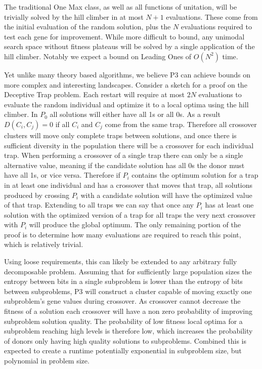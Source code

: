 \documentclass{sig-alternate}
\begin{document}
The traditional One Max class, as well as all functions of unitation, will be
trivially solved by the hill climber in at most $N+1$ evaluations.  These come
from the initial evaluation of the random solution, plus the $N$ evaluations required
to test each gene for improvement.  While more difficult to bound, any unimodal
search space without fitness plateaus will be solved by a single application
of the hill climber.  Notably we expect a bound on Leading Ones of $O(N^2)$ time.

Yet unlike many theory based algorithms, we believe P3 can achieve bounds on more
complex and interesting landscapes.  Consider a sketch for a proof on the Deceptive
Trap problem.  Each restart will require at most $2N$ evaluations to evaluate the
random individual and optimize it to a local optima using the hill climber.  In
$P_0$ all solutions will either have all 1s or all 0s.  As a result $D(C_i, C_j) = 0$
if all $C_i$ and $C_j$ come from the same trap.  Therefore all crossover clusters
will move only complete traps between solutions, and once there is sufficient
diversity in the population there will be a crossover for each individual trap.
When performing a crossover of a single trap there can only be a single alternative
value, meaning if the candidate solution has all 0s the donor must have all 1s, or vice
versa.  Therefore if $P_i$ contains the optimum solution for a trap in at least one
individual and has a crossover that moves that trap, all solutions produced by crossing
$P_i$ with a candidate solution will have the optimized value of that trap.  Extending to
all traps we can say that once any $P_i$ has at least one solution with the optimized
version of a trap for all traps the very next crossover with $P_i$ will produce the global optimum.
The only remaining portion of the proof is to determine how many evaluations are required to reach this point,
which is relatively trivial.

Using loose requirements, this can likely be extended to any arbitrary fully decomposable
problem. Assuming that for sufficiently large population sizes the entropy between
bits in a single subproblem is lower than the entropy of bits between subproblems,
P3 will construct a cluster capable of moving exactly one subproblem's gene values
during crossover.  As crossover cannot decrease the fitness of a solution each
crossover will have a non zero probability of improving subproblem solution quality.
The probability of low fitness local optima for a subproblem reaching high levels
is therefore low, which increases the probability of donors only having high quality
solutions to subproblems.  Combined this is expected to create a runtime potentially
exponential in subproblem size, but polynomial in problem size.
\end{document}

